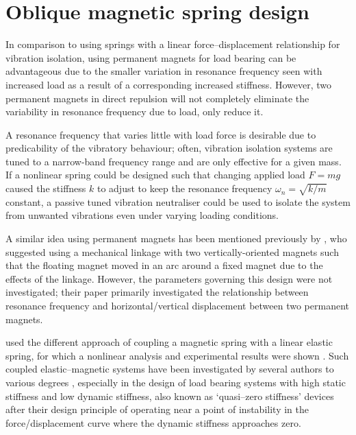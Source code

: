 \section{Oblique magnetic spring design}

In comparison to using springs with a linear force--displacement relationship for vibration isolation, using permanent magnets for load bearing can be advantageous due to the smaller variation in resonance frequency seen with increased load as a result of a corresponding increased stiffness. However, two permanent magnets in direct repulsion will not completely eliminate the variability in resonance frequency due to load, only reduce it.

A resonance frequency that varies little with load force is desirable due to predicability of the vibratory behaviour; often, vibration isolation systems are tuned to a narrow-band frequency range and are only effective for a given mass. If a nonlinear spring could be designed such that changing applied load $F=mg$ caused the stiffness $k$ to adjust to keep the resonance frequency $\omega_n=\sqrt{k/m}$ constant, a passive tuned vibration neutraliser could be used to isolate the system from unwanted vibrations even under varying loading conditions.

A similar idea using permanent magnets has been mentioned previously by \textcite{todaka2001-ietm}, who suggested using a mechanical linkage with two vertically-oriented magnets such that the floating magnet moved in an arc around a fixed magnet due to the effects of the linkage. However, the parameters governing this design were not investigated; their paper primarily investigated the relationship between resonance frequency and horizontal/vertical displacement between two permanent magnets.

\citeauthor{bonisoli2007-mrc} used the different approach of coupling a magnetic spring with a linear elastic spring, for which a nonlinear analysis and experimental results were shown \parencite{bonisoli2007-mssp, bonisoli2007-mrc}. Such coupled elastic--magnetic systems have been investigated by several authors to various degrees \parencite{trimboli1994, beccaria1997,carrella2008-jsv,zhou2010-jsv}, especially in the design of load bearing systems with high static stiffness and low dynamic stiffness, also known as `quasi--zero stiffness' devices after their design principle of operating near a point of instability in the force/displacement curve where the dynamic stiffness approaches zero.

